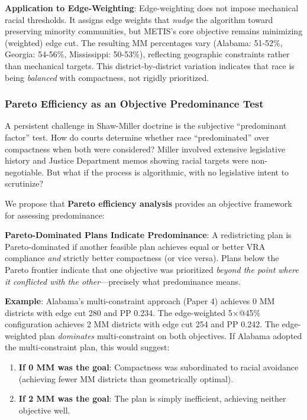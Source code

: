 \textbf{Application to Edge-Weighting}: Edge-weighting does not impose mechanical racial thresholds. It assigns edge weights that \emph{nudge} the algorithm toward preserving minority communities, but METIS's core objective remains minimizing (weighted) edge cut. The resulting MM percentages vary (Alabama: 51-52\%, Georgia: 54-56\%, Mississippi: 50-53\%), reflecting geographic constraints rather than mechanical targets. This district-by-district variation indicates that race is being \emph{balanced} with compactness, not rigidly prioritized.

\subsubsection{Pareto Efficiency as an Objective Predominance Test}

A persistent challenge in Shaw-Miller doctrine is the subjective ``predominant factor'' test. How do courts determine whether race ``predominated'' over compactness when both were considered? Miller involved extensive legislative history and Justice Department memos showing racial targets were non-negotiable. But what if the process is algorithmic, with no legislative intent to scrutinize?

We propose that \textbf{Pareto efficiency analysis} provides an objective framework for assessing predominance:

\textbf{Pareto-Dominated Plans Indicate Predominance}: A redistricting plan is Pareto-dominated if another feasible plan achieves equal or better VRA compliance \emph{and} strictly better compactness (or vice versa). Plans below the Pareto frontier indicate that one objective was prioritized \emph{beyond the point where it conflicted with the other}---precisely what predominance means.

\textbf{Example}: Alabama's multi-constraint approach (Paper 4) achieves 0 MM districts with edge cut 280 and PP 0.234. The edge-weighted 5×@45\% configuration achieves 2 MM districts with edge cut 254 and PP 0.242. The edge-weighted plan \emph{dominates} multi-constraint on both objectives. If Alabama adopted the multi-constraint plan, this would suggest:
\begin{enumerate}
    \item \textbf{If 0 MM was the goal}: Compactness was subordinated to racial avoidance (achieving fewer MM districts than geometrically optimal).
    \item \textbf{If 2 MM was the goal}: The plan is simply inefficient, achieving neither objective well.
\end{enumerate}

